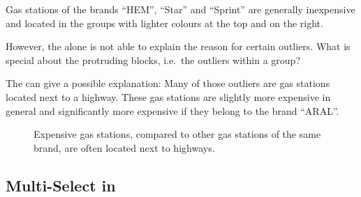Gas stations of the brands ``HEM'', ``Star'' and ``Sprint'' are generally inexpensive and located in the groups with lighter colours at the top and on the right.

However, the \tmap{} alone is not able to explain the reason for certain outliers.
What is special about the protruding blocks, i.e.\ the outliers within a group?

The \gv{} can give a possible explanation:
Many of those outliers are gas stations located next to a highway.
These gas stations are slightly more expensive in general and significantly more expensive if they belong to the brand ``ARAL''.

\begin{figure}
  \centering
  \qquad
  \caption{
    Expensive gas stations, compared to other gas stations of the same brand, are often located next to highways.
  }\label{fig:evaluation:use-cases:gas-prices}
\end{figure}

\subsection{Multi-Select in \tmap{}}\label{sec:evaluation:use-cases:multiselect}

